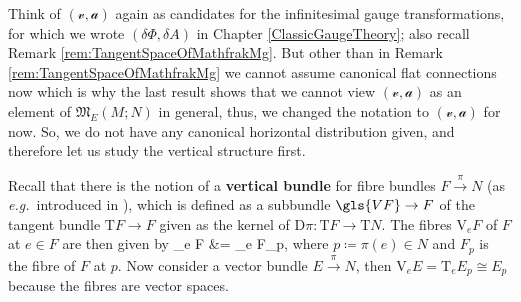 Think of $(\mathcal{v}, \mathcal{a})$ again as candidates for the infinitesimal gauge transformations, for which we wrote $(\delta \Phi, \delta A)$ in Chapter \ref{ClassicGaugeTheory}; also recall Remark \ref{rem:TangentSpaceOfMathfrakMg}. But other than in Remark \ref{rem:TangentSpaceOfMathfrakMg} we cannot assume canonical flat connections now which is why the last result shows that we cannot view $(\mathcal{v}, \mathcal{a})$ as an element of $\mathfrak{M}_E(M;N)$ in general, thus, we changed the notation to $(\mathcal{v}, \mathcal{a})$ for now. So, we do not have any canonical horizontal distribution given, and therefore let us study the vertical structure first.

Recall that there is the notion of a \textbf{vertical bundle} for fibre bundles $F \stackrel{\pi}{\to} N$ (as \textit{e.g.}~introduced in \cite[\S 5.1.1, for principal bundles, but it is straightforward to extend the definitions; page 258ff.]{hamilton}), which is defined as a subbundle $\gls{VF} \to F$ of the tangent bundle $\mathrm{T}F \to F$ given as the kernel of $\mathrm{D}\pi : \mathrm{T}F \to \mathrm{T}N$. The fibres $\mathrm{V}_eF$ of $F$ at $e \in F$ are then given by 
\bas
{}_e F
&=
_e F_p,
\eas
where $p \coloneqq \pi(e) \in N$ and $F_p$ is the fibre of $F$ at $p$.
Now consider a vector bundle $E \stackrel{\pi}{\to} N$, then $\mathrm{V}_e E = \mathrm{T}_e E_p \cong E_p$ because the fibres are vector spaces.

